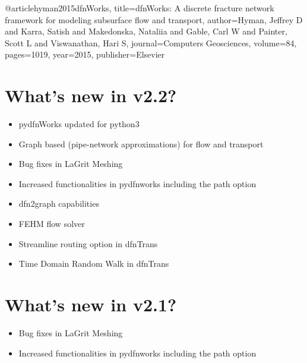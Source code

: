 \documentclass[letterpaper,10pt,english]{sphinxmanual}
\begin{document}

%
\begin{sphinxVerbatim}[commandchars=\\\{\}]
  @article\PYGZob{}hyman2015dfnWorks,
    title=\PYGZob{}dfnWorks: A discrete fracture network framework
for modeling subsurface flow and transport\PYGZcb{},
    author=\PYGZob{}Hyman, Jeffrey D and Karra, Satish and Makedonska,
Nataliia and Gable, Carl W and Painter, Scott L
and Viswanathan, Hari S\PYGZcb{},
    journal=\PYGZob{}Computers \PYGZbs{}\PYGZam{} Geosciences\PYGZcb{},
    volume=\PYGZob{}84\PYGZcb{},
    pages=\PYGZob{}10\PYGZhy{}\PYGZhy{}19\PYGZcb{},
    year=\PYGZob{}2015\PYGZcb{},
    publisher=\PYGZob{}Elsevier\PYGZcb{}
  \PYGZcb{}
\end{sphinxVerbatim}


\section{What’s new in v2.2?}
\label{\detokenize{intro:what-s-new-in-v2-2}}\begin{itemize}
\item {} 
pydfnWorks updated for python3

\item {} 
Graph based (pipe-network approximations) for flow and transport

\item {} 
Bug fixes in LaGrit Meshing

\item {} 
Increased functionalities in pydfnworks including the path option

\item {} 
dfn2graph capabilities

\item {} 
FEHM flow solver

\item {} 
Streamline routing option in dfnTrans

\item {} 
Time Domain Random Walk in dfnTrans

\end{itemize}


\section{What’s new in v2.1?}
\label{\detokenize{intro:what-s-new-in-v2-1}}\begin{itemize}
\item {} 
Bug fixes in LaGrit Meshing

\item {} 
Increased functionalities in pydfnworks including the path option

\end{itemize}
\end{document}

